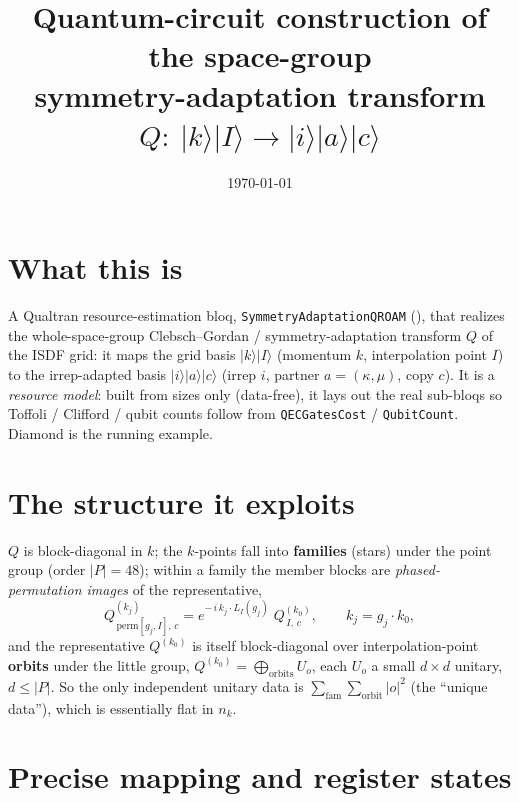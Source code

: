 \documentclass[11pt]{article}
\title{\vspace{-1.2cm}Quantum-circuit construction of the space-group\\[2pt]
symmetry-adaptation transform $Q:\ |k\rangle|I\rangle \to |i\rangle|a\rangle|c\rangle$}
\author{}
\date{\today}
\begin{document}
\maketitle
\vspace{-0.9cm}

\section*{What this is}

A Qualtran resource-estimation bloq, \texttt{SymmetryAdaptationQROAM}
(), that realizes the whole-space-group
Clebsch--Gordan / symmetry-adaptation transform $Q$ of the ISDF grid: it maps the grid basis
$|k\rangle|I\rangle$ (momentum $k$, interpolation point $I$) to the irrep-adapted basis
$|i\rangle|a\rangle|c\rangle$ (irrep $i$, partner $a=(\kappa,\mu)$, copy $c$). It is a
\emph{resource model}: built from sizes only (data-free), it lays out the real sub-bloqs so
Toffoli / Clifford / qubit counts follow from \texttt{QECGatesCost} / \texttt{QubitCount}. Diamond is
the running example.

\section*{The structure it exploits}

$Q$ is block-diagonal in $k$; the $k$-points fall into \textbf{families} (stars) under the point group
(order $|P|=48$); within a family the member blocks are \emph{phased-permutation images} of the
representative,
\[
   Q^{(k_j)}_{\,\mathrm{perm}[g_j,I],\,c} = e^{-\,i\,k_j\cdot L_I(g_j)}\;Q^{(k_0)}_{\,I,\,c},
   \qquad k_j = g_j\!\cdot\! k_0 ,
\]
and the representative $Q^{(k_0)}$ is itself block-diagonal over interpolation-point \textbf{orbits}
under the little group, $Q^{(k_0)}=\bigoplus_{\text{orbits}}U_o$, each $U_o$ a small $d\times d$
unitary, $d\le|P|$. So the only independent unitary data is $\sum_{\text{fam}}\sum_{\text{orbit}}|o|^2$
(the ``unique data''), which is essentially flat in $n_k$.

\section*{Precise mapping and register states}
\end{document}
